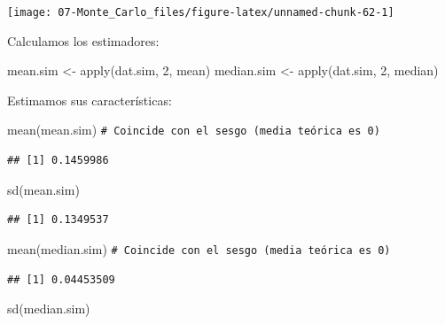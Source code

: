 \documentclass[
]{book}
\newenvironment{Shaded}{\begin{snugshade}}{\end{snugshade}}
\newcommand{\CommentTok}[1]{\textcolor[rgb]{0.56,0.35,0.01}{\textit{#1}}}
\newcommand{\DecValTok}[1]{\textcolor[rgb]{0.00,0.00,0.81}{#1}}
\newcommand{\FunctionTok}[1]{\textcolor[rgb]{0.00,0.00,0.00}{#1}}
\newcommand{\NormalTok}[1]{#1}
\newcommand{\OtherTok}[1]{\textcolor[rgb]{0.56,0.35,0.01}{#1}}
\theoremstyle{break}
\theoremstyle{nonumberplain}
\renewcommand{\CommentTok}[1]{\textcolor[rgb]{0.41,0.41,0.41}{\texttt{#1}}}
\begin{document}
\begin{enumerate}
  \begin{center}\texttt{[image: 07-Monte\_Carlo\_files/figure-latex/unnamed-chunk-62-1]} \end{center}

  Calculamos los estimadores:

\begin{Shaded}
\begin{Highlighting}[]
\NormalTok{mean.sim }\OtherTok{\textless{}{-}} \FunctionTok{apply}\NormalTok{(dat.sim, }\DecValTok{2}\NormalTok{, mean)}
\NormalTok{median.sim }\OtherTok{\textless{}{-}} \FunctionTok{apply}\NormalTok{(dat.sim, }\DecValTok{2}\NormalTok{, median)}
\end{Highlighting}
\end{Shaded}

  Estimamos sus características:

\begin{Shaded}
\begin{Highlighting}[]
\FunctionTok{mean}\NormalTok{(mean.sim) }\CommentTok{\# Coincide con el sesgo (media teórica es 0)}
\end{Highlighting}
\end{Shaded}

\begin{verbatim}
## [1] 0.1459986
\end{verbatim}

\begin{Shaded}
\begin{Highlighting}[]
\FunctionTok{sd}\NormalTok{(mean.sim)}
\end{Highlighting}
\end{Shaded}

\begin{verbatim}
## [1] 0.1349537
\end{verbatim}

\begin{Shaded}
\begin{Highlighting}[]
\FunctionTok{mean}\NormalTok{(median.sim) }\CommentTok{\# Coincide con el sesgo (media teórica es 0)}
\end{Highlighting}
\end{Shaded}

\begin{verbatim}
## [1] 0.04453509
\end{verbatim}

\begin{Shaded}
\begin{Highlighting}[]
\FunctionTok{sd}\NormalTok{(median.sim)}
\end{Highlighting}
\end{Shaded}


\end{enumerate}
\end{document}
